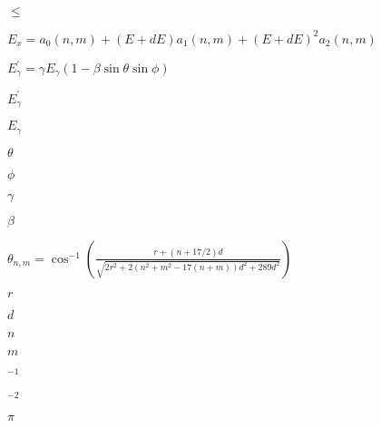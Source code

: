 \documentclass{article}
\begin{document}
$\leq$
\pagebreak

$E_x = a_0(n,m) + (E + dE)a_1(n,m) + (E + dE)^2a_2(n,m)$
\pagebreak

$E_\gamma^\prime = \gamma E_\gamma (1 - \beta\sin\theta\sin\phi)$
\pagebreak

$E_\gamma^\prime$
\pagebreak

$E_\gamma$
\pagebreak

$\theta$
\pagebreak

$\phi$
\pagebreak

$\gamma$
\pagebreak

$\beta$
\pagebreak

$\theta_{n,m} = \cos^{-1}(\frac{r + (n + 17/2)d}{\sqrt{2r^2 + 2(n^2 + m^2 - 17(n + m))d^2 + 289d^2}})$
\pagebreak

$r$
\pagebreak

$d$
\pagebreak

$n$
\pagebreak

$m$
\pagebreak

$^{-1}$
\pagebreak

$^{-2}$
\pagebreak

$\pi$
\pagebreak
\end{document}
